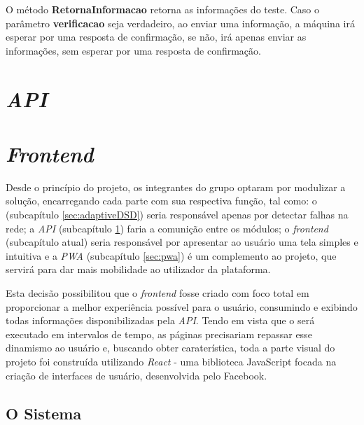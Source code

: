 O método \textbf{RetornaInformacao} retorna as informações do teste. Caso o parâmetro \textbf{verificacao} seja verdadeiro, ao enviar uma informação, a máquina irá esperar por uma resposta 
de confirmação, se não, irá apenas enviar as informações, sem esperar por uma resposta de confirmação.




\section{\textit{API}}
\label{sec:api}









\section{\textit{Frontend}}
\label{sec:frontend}

Desde o princípio do projeto, os integrantes do grupo optaram por modulizar a solução, encarregando cada parte com sua respectiva função, tal como: o \adaptive{} (subcapítulo \ref{sec:adaptiveDSD}) seria responsável apenas por detectar falhas na rede; a \textit{API} (subcapítulo \ref{sec:api}) faria a comunição entre os módulos; o \textit{frontend} (subcapítulo atual) seria responsável por apresentar ao usuário uma tela simples e intuitiva e a \textit{PWA} (subcapítulo \ref{sec:pwa}) é um complemento ao projeto, que servirá para dar mais mobilidade ao utilizador da plataforma.

Esta decisão possibilitou que o \textit{frontend} fosse criado com foco total em proporcionar a melhor experiência possível para o usuário, consumindo e exibindo todas informações disponibilizadas pela \textit{API}. Tendo em vista que o \adaptive{}será executado em intervalos de tempo, as páginas precisariam repassar esse dinamismo ao usuário e, buscando obter caraterística, toda a parte visual do projeto foi construída utilizando \textit{React} - uma biblioteca JavaScript focada na criação de interfaces de usuário, desenvolvida pelo Facebook.


\subsection{O Sistema}
\label{sec:o_sistema}

